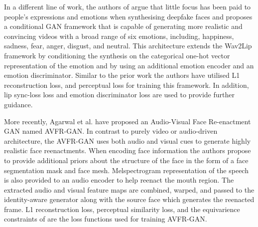 In a different line of work, the authors of \cite{goyal2023emotionally} argue that little focus has been paid to people's expressions and emotions when synthesising deepfake faces and proposes a conditional GAN framework that is capable of generating more realistic and convincing videos with a broad range of six emotions, including, happiness, sadness, fear, anger, disgust, and neutral. This architecture extends the Wav2Lip \cite{chung2017out} framework by conditioning the synthesis on the categorical one-hot vector representation of the emotion and by using an additional emotion encoder and an emotion discriminator. Similar to the prior work the authors have utilised L1 reconstruction loss, and perceptual loss for training this framework. In addition, lip sync-loss loss and emotion discriminator loss are used to provide further guidance. 


More recently, Agarwal et al. \cite{agarwal2023audio} have proposed an Audio-Visual Face Re-enactment GAN named AVFR-GAN. In contrast to purely video or audio-driven architecture, the AVFR-GAN uses both audio and visual cues to generate highly realistic face reenactments. When encoding face information the authors propose to provide additional priors about the structure of the face in the form of a face segmentation mask and face mesh. Melspectrogram representation of the speech is also provided to an audio encoder to help reenact the mouth region. The extracted audio and visual feature maps are combined, warped, and passed to the identity-aware generator along with the source face which generates the reenacted frame. L1 reconstruction loss, perceptual similarity loss, and the equivarience constraints of \cite{siarohin2019first} are the loss functions used for training AVFR-GAN.

